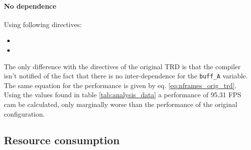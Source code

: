 \paragraph{No dependence}
Using following directives:

\begin{itemize}
\item {}
\item {}
\end{itemize}

The only difference with the directives of the original TRD is that the compiler isn't notified of the fact that there is no inter-dependence for the \texttt{buff\_A} variable. The same equation for the performance is given by eq. \ref{eq:nframes_orig_trd}. Using the values found in table \ref{tab:analysis_data} a performance of 95.31 FPS cam be calculated, only marginally worse than the performance of the original configuration. 


\subsection{Resource consumption}



\newpage





